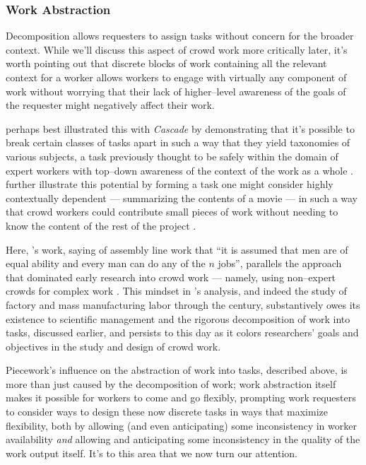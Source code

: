 \documentclass{sigchi}
\begin{document}
\subsubsection{Work Abstraction}\label{sec:workAbstraction}
Decomposition allows requesters to assign tasks without concern for the broader context.
While we'll discuss this aspect of crowd work more critically later,
it's worth pointing out that discrete blocks of work containing all the relevant context for a worker
allows workers to engage with virtually any component of work without worrying that their lack of 
higher--level awareness of the goals of the requester might negatively affect their work.

\citeauthor{chilton2013cascade} perhaps best illustrated this with
\textit{Cascade} by demonstrating that it's possible to
break certain classes of tasks apart
in such a way that they yield taxonomies of various subjects,
a task previously thought to be safely within the domain of expert workers
with top--down awareness of the context of the work as a whole
\cite{chilton2013cascade}.
\citeauthor{verroios2014context} further illustrate this potential by
forming a task one might consider highly contextually dependent
--- summarizing the contents of a movie ---
in such a way that crowd workers could contribute small pieces of work without
needing to know the content of the rest of the project
\cite{verroios2014context}.

Here, \citeauthor{hu1961parallel}'s work,
saying of assembly line work that
``it is assumed that men are of equal ability and every man can do any of the $n$ jobs'',
parallels the approach that dominated early research into crowd work
--- namely, using non--expert crowds for complex work
\cite{hu1961parallel}.
This mindset in \citeauthor{hu1961parallel}'s analysis,
and indeed the study of factory and mass manufacturing labor through the  century,
substantively owes its existence to scientific management
and the rigorous decomposition of work into tasks, discussed earlier,
and persists to this day as it colors
researchers' goals and objectives in the study and design of crowd work.

Piecework's influence on the abstraction of work into tasks,
described above, is more than just caused by the decomposition of work;
work abstraction itself makes it possible for workers to come and go flexibly,
prompting work requesters to consider ways to design these now discrete tasks in ways that
maximize flexibility, both by allowing (and even anticipating) some inconsistency in worker availability
\textit{and} allowing and anticipating some inconsistency in the quality of the work output itself.
It's to this area that we now turn our attention.
\end{document}
